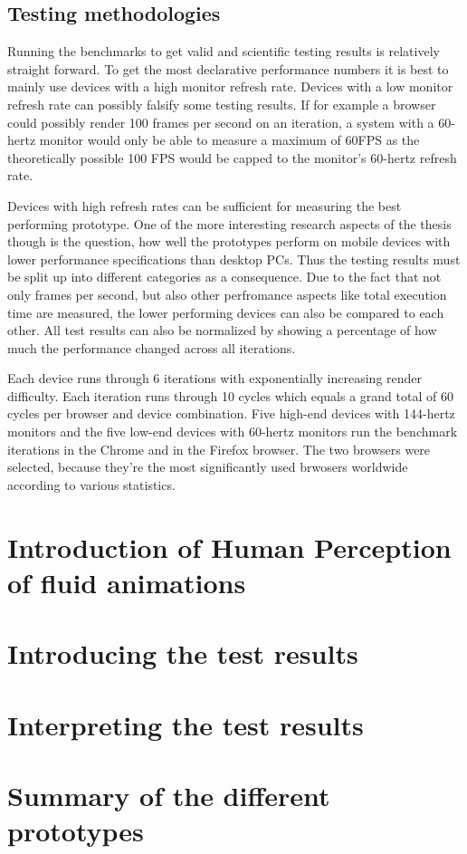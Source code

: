 \subsection{Testing methodologies}

Running the benchmarks to get valid and scientific testing results is relatively straight forward. To get the most declarative performance numbers it is best to mainly use devices with a high monitor refresh rate. Devices with a low monitor refresh rate can possibly falsify some testing results. If for example a browser could possibly render 100 frames per second on an iteration, a system with a 60-hertz monitor would only be able to measure a maximum of 60FPS as the theoretically possible 100 FPS would be capped to the monitor's 60-hertz refresh rate.

Devices with high refresh rates can be sufficient for measuring the best performing prototype. One of the more interesting research aspects of the thesis though is the question, how well the prototypes perform on mobile devices with lower performance specifications than desktop PCs. Thus the testing results must be split up into different categories as a consequence. Due to the fact that not only frames per second, but also other perfromance aspects like total execution time are measured, the lower performing devices can also be compared to each other. All test results can also be normalized by showing a percentage of how much the performance changed across all iterations.

Each device runs through 6 iterations with exponentially increasing render difficulty. Each iteration runs through 10 cycles which equals a grand total of 60 cycles per browser and device combination. Five high-end devices with 144-hertz monitors and the five low-end devices with 60-hertz monitors run the benchmark iterations in the Chrome and in the Firefox browser. The two browsers were selected, because they're the most significantly used brwosers worldwide according to various statistics. 

\section{Introduction of Human Perception of fluid animations}

\section{Introducing the test results}

\section{Interpreting the test results}

\section{Summary of the different prototypes}


